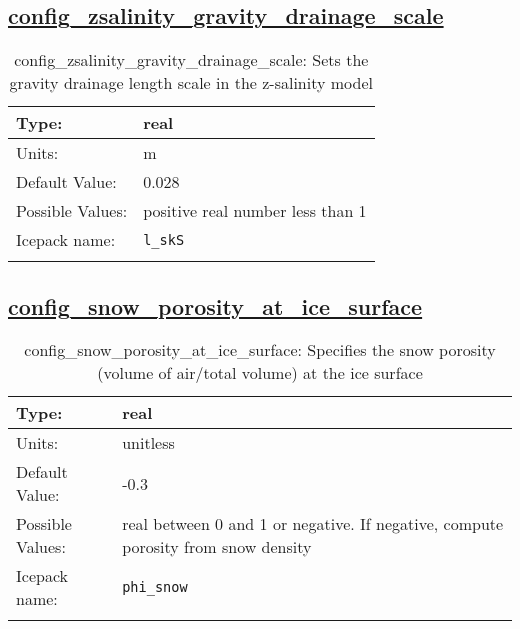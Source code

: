 \subsection[config\_zsalinity\_gravity\_drainage\_scale]{\hyperref[sec:nm_tab_biogeochemistry]{config\_zsalinity\_gravity\_drainage\_scale}}
\label{subsec:nm_sec_config_zsalinity_gravity_drainage_scale}
\begin{center}
\begin{longtable}{| p{2.0in} || p{4.0in} |}
    \hline
    Type: & real \\
    \hline
    Units: & \si{m} \\
    \hline
    Default Value: & 0.028 \\
    \hline
    Possible Values: & positive real number less than 1 \\
    \hline
    \hline
    Icepack name: & \verb+l_skS+ \\
    \caption{config\_zsalinity\_gravity\_drainage\_scale: Sets the gravity drainage length scale in the z-salinity model}
\end{longtable}
\end{center}
\subsection[config\_snow\_porosity\_at\_ice\_surface]{\hyperref[sec:nm_tab_biogeochemistry]{config\_snow\_porosity\_at\_ice\_surface}}
\label{subsec:nm_sec_config_snow_porosity_at_ice_surface}
\begin{center}
\begin{longtable}{| p{2.0in} || p{4.0in} |}
    \hline
    Type: & real \\
    \hline
    Units: & \si{unitless} \\
    \hline
    Default Value: & -0.3 \\
    \hline
    Possible Values: & real between 0 and 1 or negative.  If negative, compute porosity from snow density \\
    \hline
    \hline
    Icepack name: & \verb+phi_snow+ \\
    \caption{config\_snow\_porosity\_at\_ice\_surface: Specifies the snow porosity (volume of air/total volume) at the ice surface}
\end{longtable}
\end{center}
